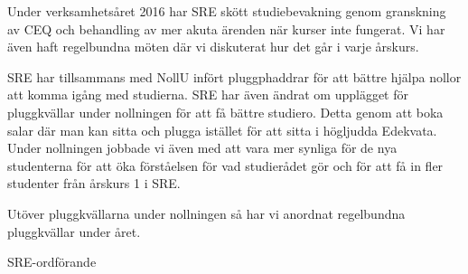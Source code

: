 \documentclass[../_main/handlingar.tex]{subfiles}
\begin{document}
Under verksamhetsåret 2016 har SRE skött studiebevakning genom granskning av CEQ och behandling av mer akuta ärenden när kurser inte fungerat. Vi har även haft regelbundna möten där vi diskuterat hur det går i varje årskurs.

SRE har tillsammans med NollU infört pluggphaddrar för att bättre hjälpa nollor att komma igång med studierna. SRE har även ändrat om upplägget för pluggkvällar under nollningen för att få bättre studiero. Detta genom att boka salar där man kan sitta och plugga istället för att sitta i högljudda Edekvata. Under nollningen jobbade vi även med att vara mer synliga för de nya studenterna för att öka förståelsen för vad studierådet gör och för att få in fler studenter från årskurs 1 i SRE.

Utöver pluggkvällarna under nollningen så har vi anordnat regelbundna pluggkvällar under året.
\begin{signatures}{1}
    \mvh
    \signature{Johan Persson}{SRE-ordförande}
\end{signatures}
\end{document}
